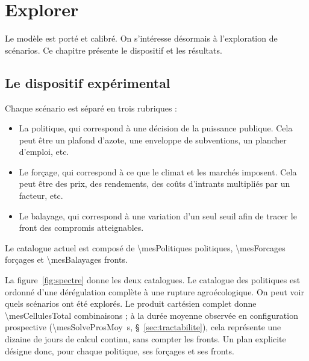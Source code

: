 \chapter{Explorer}
\label{ch:explorer}
%


Le modèle est porté et calibré. On s'intéresse désormais à l'exploration de scénarios. Ce
chapitre présente le dispositif et les résultats.

\section{Le dispositif expérimental}
\label{sec:dispositif}

Chaque scénario est séparé en trois rubriques :

\begin{itemize}[leftmargin=1.2em,itemsep=6pt]
  \item La politique, qui correspond à une décision de la puissance publique. Cela peut
    être un plafond d'azote, une enveloppe de subventions, un plancher d'emploi, etc.
  \item Le forçage, qui correspond à ce que le climat et les marchés imposent. Cela peut
    être des prix, des rendements, des coûts d'intrants multipliés par un facteur, etc.
  \item Le balayage, qui correspond à une variation d'un seul seuil afin de tracer le
    front des compromis atteignables.
\end{itemize}

Le catalogue actuel est composé de \num{\mesPolitiques} politiques, \num{\mesForcages} forçages
et \num{\mesBalayages} fronts.

La figure~\ref{fig:spectre} donne les deux catalogues. Le catalogue des politiques est ordonné
d'une dérégulation complète à une rupture agroécologique. On peut voir quels scénarios ont été
explorés. Le produit cartésien complet donne \num{\mesCellulesTotal} combinaisons ; à la durée
moyenne observée en configuration prospective (\SI{\mesSolveProsMoy}{\second}, §~\ref{sec:tractabilite}),
cela représente une dizaine de jours de calcul continu, sans compter les fronts. Un plan
explicite désigne donc, pour chaque politique, ses forçages et ses fronts.

